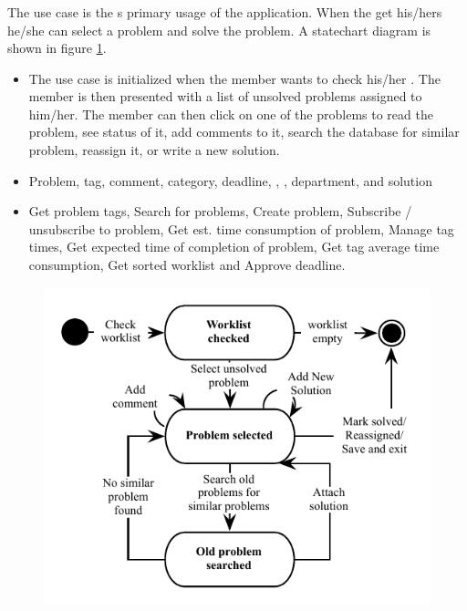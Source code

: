 \subsubsection{\ucsolproblem[c]} The use case \ucsolproblem{} is the \astaff{}s primary usage of the application. When the \astaff[] get his/hers \todolist[] he/she can select a problem and solve the problem. A statechart diagram is shown in figure \ref{fig:solve_problem_use_case}.

\begin{itemize}
\item {} The use case is initialized when the \astaff[] member wants to check his/her \todolist[]. The \astaff[] member is then presented with a list of unsolved problems assigned to him/her. The \astaff[] member can then click on one of the problems to read the problem, see status of it, add comments to it, search the database for similar problem, reassign it, or write a new solution. 

\item {} Problem, tag, comment, category, deadline, \client[], \staff[], department, and solution

\item {} Get problem tags, Search for problems, Create problem, Subscribe / unsubscribe to problem, Get est. time consumption of problem, Manage tag times, Get expected time of completion of problem, Get tag average time consumption, Get sorted worklist and Approve deadline. 
\end{itemize}

\begin{figure}[htbp]
\begin{center}
 \includegraphics[scale=0.8]{input/application_domain_analysis/solve_problem_use_case}
\label{fig:solve_problem_use_case}
\end{center}
\end{figure}

